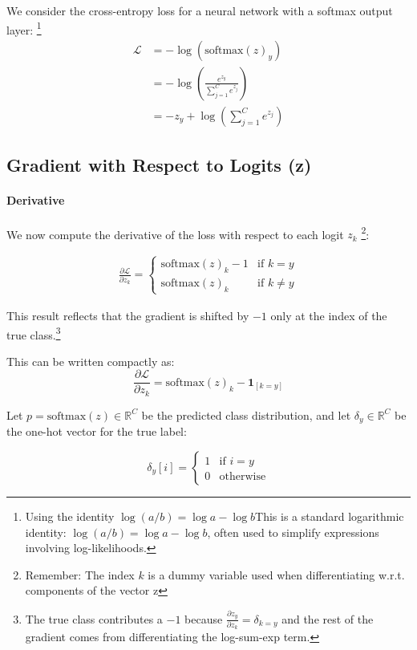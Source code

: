 We consider the cross-entropy loss for a neural network with a softmax output layer: \footnote{
Using the identity $\log(a/b) = \log a - \log b$This is a standard logarithmic identity: $\log(a/b) = \log a - \log b$, often used to simplify expressions involving log-likelihoods.}
\begin{align}
	\mathcal{L} &= -\log\left(\text{softmax}(z)_y\right) \\
		&= -\log\left( \frac{e^{z_y}}{\sum_{j=1}^C e^{z_j}} \right) \\ 
		&= -z_y + \log\left( \sum_{j=1}^C e^{z_j} \right) 
\end{align} 

\subsection*{Gradient with Respect to Logits (z)}

\paragraph{Derivative}

We now compute the derivative of the loss with respect to each logit $z_k$ \footnote{
Remember: The index $k$ is a dummy variable used when differentiating w.r.t. components of the vector z
}:

\begin{align}
\frac{\partial \mathcal{L}}{\partial z_k} =
\begin{cases}
\text{softmax}(z)_k - 1 & \text{if } k = y \\
\text{softmax}(z)_k & \text{if } k \neq y
\end{cases}
\end{align}

\noindent This result reflects that the gradient is shifted by $-1$ only at the index of the true class.\footnote{The true class contributes a $-1$ because $\frac{\partial z_y}{\partial z_k} = \delta_{k=y}$ and the rest of the gradient comes from differentiating the log-sum-exp term.}

This can be written compactly as:
\[
\frac{\partial \mathcal{L}}{\partial z_k} = \text{softmax}(z)_k - \mathbf{1}_{[k = y]}
\]

Let $p = \text{softmax}(z) \in \mathbb{R}^C$ be the predicted class distribution, and let $\delta_y \in \mathbb{R}^C$ be the one-hot vector for the true label:

\[
\delta_y[i] = 
\begin{cases}
1 & \text{if } i = y \\
0 & \text{otherwise}
\end{cases}
\]

